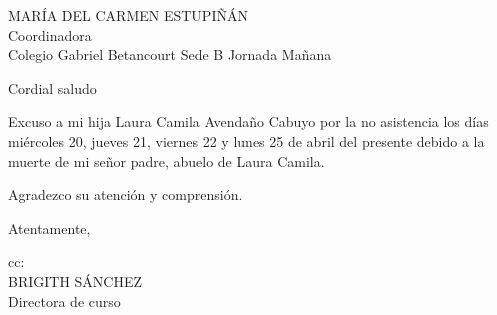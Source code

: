 \documentclass[letterpaper,spanish,11pt]{letter}
\begin{document}
\begin{letter}{MARÍA DEL CARMEN ESTUPIÑÁN\\Coordinadora\\Colegio Gabriel Betancourt Sede B Jornada Mañana}
	
\opening{Cordial saludo}
Excuso a mi hija Laura Camila Avendaño Cabuyo por la no asistencia los días miércoles 20, jueves 21, viernes 22 y lunes 25 de abril del presente debido a la muerte de mi señor padre, abuelo de Laura Camila.

Agradezco su atención y comprensión.
\closing{Atentamente,}

cc{:\\BRIGITH SÁNCHEZ\\
Directora de curso}

\end{letter}
\end{document}
